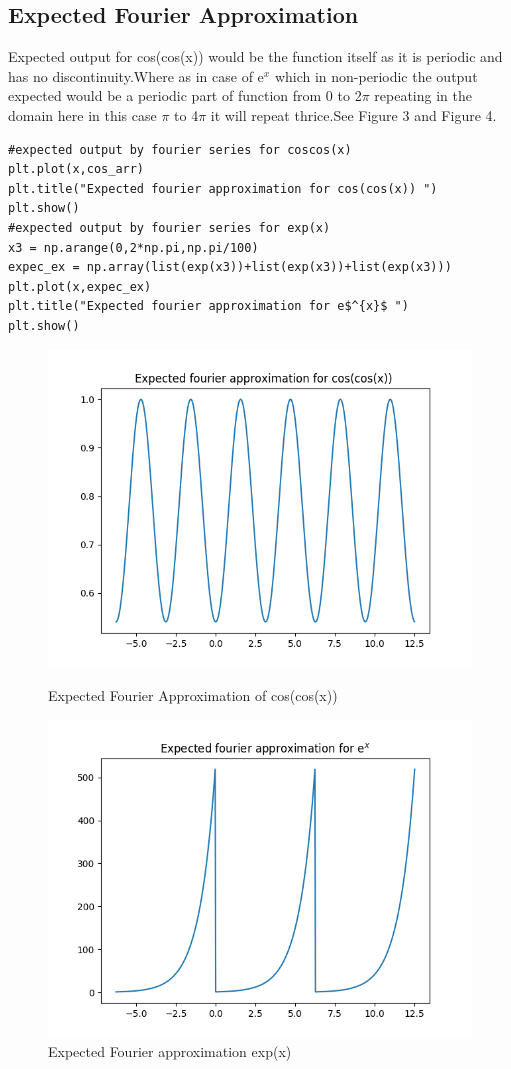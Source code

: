 \documentclass[a4paper]{article}
\begin{document}
\subsection{Expected Fourier Approximation}
Expected output for cos(cos(x)) would be the function itself as it is periodic and has no discontinuity.Where as in case of e$^{x}$ which in non-periodic the output expected would be a periodic part of function from 0 to 2$\pi$ repeating in the domain here in this case $\pi$ to 4$\pi$ it will repeat thrice.See Figure 3 and Figure 4.
\begin{lstlisting}
#expected output by fourier series for coscos(x)
plt.plot(x,cos_arr)
plt.title("Expected fourier approximation for cos(cos(x)) ")
plt.show()
#expected output by fourier series for exp(x)
x3 = np.arange(0,2*np.pi,np.pi/100)
expec_ex = np.array(list(exp(x3))+list(exp(x3))+list(exp(x3)))
plt.plot(x,expec_ex)
plt.title("Expected fourier approximation for e$^{x}$ ")
plt.show()
\end{lstlisting}

\begin{figure}
\includegraphics[width=\columnwidth]{expectedcoscos.png}
\caption{Expected Fourier Approximation of cos(cos(x))}
\includegraphics[width=\columnwidth]{expectedex.png}
\caption{Expected Fourier approximation exp(x)}
\end{figure}
\end{document}
